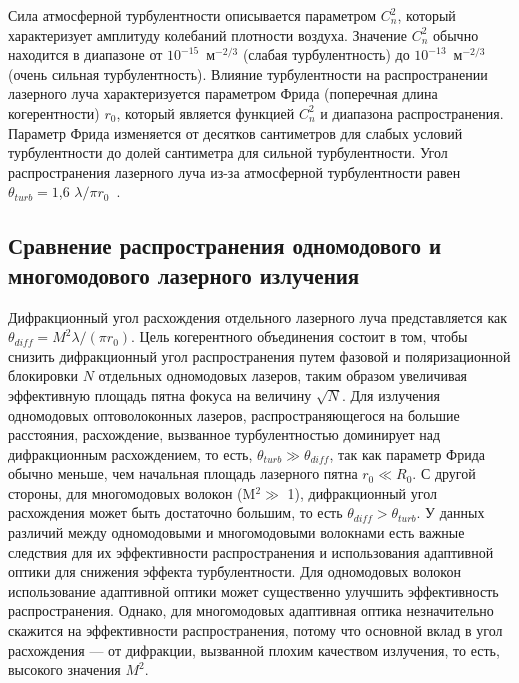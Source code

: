 Сила атмосферной турбулентности описывается параметром $C_n^2$, который характеризует амплитуду колебаний плотности воздуха. Значение $C_n^2$ обычно находится в диапазоне от $10^{-15}$~м$^{-2/3}$ (слабая турбулентность) до $10^{-13}$~м$^{-2/3}$ (очень сильная турбулентность). Влияние турбулентности на распространении лазерного луча характеризуется параметром Фрида (поперечная длина когерентности) $r_0$, который является функцией $C_n^2$ и диапазона распространения. Параметр Фрида изменяется от десятков сантиметров для слабых условий турбулентности до долей сантиметра для сильной турбулентности. Угол распространения лазерного луча из-за атмосферной турбулентности равен $\theta_{turb} = 1$,6 $\lambda/\pi r_0$~\cite{NRL6, NRL7}.

\subsection{Сравнение распространения одномодового и многомодового лазерного излучения}

Дифракционный угол расхождения отдельного лазерного луча представляется как $\theta_{diff} = M^2 \lambda / (\pi r_0)$. Цель когерентного объединения состоит в том, чтобы снизить дифракционный угол распространения путем фазовой и поляризационной блокировки $N$ отдельных одномодовых  лазеров, таким образом увеличивая эффективную площадь пятна фокуса на величину $\sqrt{N}$. Для излучения одномодовых оптоволоконных лазеров, распространяющегося на большие расстояния, расхождение, вызванное турбулентностью доминирует над дифракционным расхождением, то есть, $\theta_{turb} \gg \theta_{diff}$, так как параметр Фрида обычно меньше, чем начальная площадь лазерного пятна $r_0 \ll R_0$. С другой стороны, для многомодовых волокон (M$^2 \gg$ 1), дифракционный угол расхождения может быть достаточно большим, то есть $\theta_{diff}>\theta_{turb}$. У данных различий между одномодовыми и многомодовыми волокнами есть важные следствия для их эффективности распространения и использования адаптивной оптики для снижения эффекта турбулентности. Для одномодовых волокон использование адаптивной оптики может существенно улучшить эффективность распространения. Однако, для многомодовых адаптивная оптика незначительно скажится на эффективности распространения, потому что основной вклад в угол расхождения --- от дифракции, вызванной плохим качеством излучения, то есть, высокого значения $M^2$.

